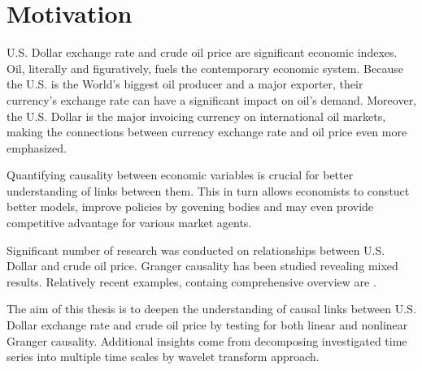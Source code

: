 \section{Motivation} \label{sec:motivation}

U.S. Dollar exchange rate and crude oil price are significant economic indexes.
Oil, literally and figuratively, fuels the contemporary economic system.
Because the U.S. is the World's biggest oil producer and a major exporter, their currency's exchange rate 
can have a significant impact on oil's demand. Moreover, the U.S. Dollar is the major invoicing currency
on international oil markets, making the connections between currency exchange rate and oil price even more
emphasized.

Quantifying causality between economic variables is crucial for better understanding of links between them.
This in turn allows economists to constuct better models, improve policies by govening bodies and may even 
provide competitive advantage for various market agents.

Significant number of research was conducted on relationships between U.S. Dollar and crude oil price.
Granger causality has been studied revealing mixed results. Relatively recent examples, containg comprehensive
overview are \cite{2010-oil-dollar, 2012-benhmad, 2017-oil-dollar}.

The aim of this thesis is to deepen the understanding of causal links between U.S. Dollar exchange rate
and crude oil price by testing for both linear and nonlinear Granger causality.
Additional insights come from decomposing investigated time series into multiple time scales by wavelet
transform approach.
